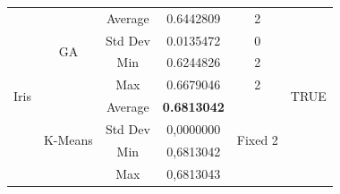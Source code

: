 \documentclass[journal]{IEEEtran}
\begin{document}
\begin{table}[]
\begin{tabular}{|c|c|c|c|c|c|}
		\multirow{8}{*}{Iris}                  & \multirow{4}{*}{GA}           & Average                        & 0.6442809                   & 2                        & \multirow{8}{*}{TRUE} \\ \cline{3-5}
		&                               & Std Dev                        & 0.0135472                   & 0                        &                       \\ \cline{3-5}
		&                               & Min                            & 0.6244826                   & 2                        &                       \\ \cline{3-5}
		&                               & Max                            & 0.6679046                   & 2                        &                       \\ \cline{2-5}
		& \multirow{4}{*}{K-Means}      & Average                        & \textbf{0.6813042}                   & \multirow{4}{*}{Fixed 2} &                       \\ \cline{3-4}
		&                               & Std Dev                        & 0,0000000                   &                          &                       \\ \cline{3-4}
		&                               & Min                            & 0,6813042                   &                          &                       \\ \cline{3-4}
		&                               & Max                            & 0,6813043                   &                          &                       \\ \cline{3-4}
	\end{tabular}
\end{table}
\end{document}
